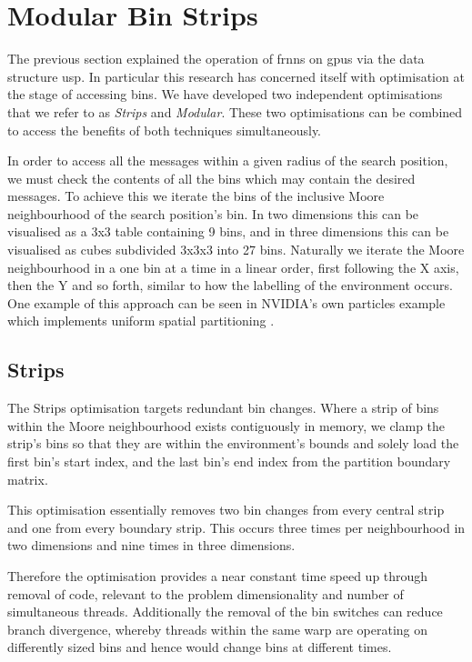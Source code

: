 \section{Modular Bin Strips\label{sec:innovation}}
  The previous section explained the operation of \gls{frnns} on \glspl{gpu} via the data structure \gls{usp}. In particular this research has concerned itself with optimisation at the stage of accessing bins. We have developed two independent optimisations that we refer to as \textit{Strips} and \textit{Modular}. These two optimisations can be combined to access the benefits of both techniques simultaneously.
    
  In order to access all the messages within a given radius of the search position, we must check the contents of all the bins which may contain the desired messages. To achieve this we iterate the bins of the inclusive Moore neighbourhood of the search position's bin. In two dimensions this can be visualised as a 3x3 table containing 9 bins, and in three dimensions this can be visualised as cubes subdivided 3x3x3 into 27 bins. Naturally we iterate the Moore neighbourhood in a one bin at a time in a linear order, first following the X axis, then the Y and so forth, similar to how the labelling of the environment occurs. One example of this approach can be seen in NVIDIA's own particles example which implements uniform spatial partitioning \cite{Gre10}.
  
  \subsection{Strips}
    The Strips optimisation targets redundant bin changes. Where a strip of bins within the Moore neighbourhood exists contiguously in memory, we clamp the strip's bins so that they are within the environment's bounds and  solely load the first bin's start index, and the last bin's end index from the partition boundary matrix.
    
    This optimisation essentially removes two bin changes from every central strip and one from every boundary strip. This occurs three times per neighbourhood in two dimensions and nine times in three dimensions. 
    
    Therefore the optimisation provides a near constant time speed up through removal of code, relevant to the problem dimensionality and number of simultaneous threads. Additionally the removal of the bin switches can reduce branch divergence, whereby threads within the same warp are operating on differently sized bins and hence would change bins at different times.
    
